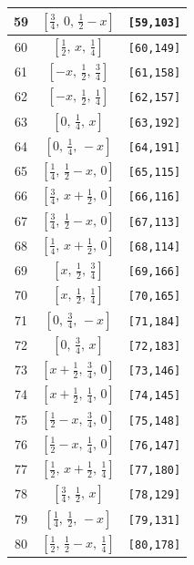 \documentclass[fleqn,8pt]{jsarticle}
\begin{document}
\begin{longtable}{ccc}
59 & $\left[ \frac{3}{4},\, 0,\, \frac{1}{2} - x \right]$ & {\tt [59,103]} \\ \hline
60 & $\left[ \frac{1}{2},\, x,\, \frac{1}{4} \right]$ & {\tt [60,149]} \\ \hline
61 & $\left[ - x,\, \frac{1}{2},\, \frac{3}{4} \right]$ & {\tt [61,158]} \\ \hline
62 & $\left[ - x,\, \frac{1}{2},\, \frac{1}{4} \right]$ & {\tt [62,157]} \\ \hline
63 & $\left[ 0,\, \frac{1}{4},\, x \right]$ & {\tt [63,192]} \\ \hline
64 & $\left[ 0,\, \frac{1}{4},\, - x \right]$ & {\tt [64,191]} \\ \hline
65 & $\left[ \frac{1}{4},\, \frac{1}{2} - x,\, 0 \right]$ & {\tt [65,115]} \\ \hline
66 & $\left[ \frac{3}{4},\, x + \frac{1}{2},\, 0 \right]$ & {\tt [66,116]} \\ \hline
67 & $\left[ \frac{3}{4},\, \frac{1}{2} - x,\, 0 \right]$ & {\tt [67,113]} \\ \hline
68 & $\left[ \frac{1}{4},\, x + \frac{1}{2},\, 0 \right]$ & {\tt [68,114]} \\ \hline
69 & $\left[ x,\, \frac{1}{2},\, \frac{3}{4} \right]$ & {\tt [69,166]} \\ \hline
70 & $\left[ x,\, \frac{1}{2},\, \frac{1}{4} \right]$ & {\tt [70,165]} \\ \hline
71 & $\left[ 0,\, \frac{3}{4},\, - x \right]$ & {\tt [71,184]} \\ \hline
72 & $\left[ 0,\, \frac{3}{4},\, x \right]$ & {\tt [72,183]} \\ \hline
73 & $\left[ x + \frac{1}{2},\, \frac{3}{4},\, 0 \right]$ & {\tt [73,146]} \\ \hline
74 & $\left[ x + \frac{1}{2},\, \frac{1}{4},\, 0 \right]$ & {\tt [74,145]} \\ \hline
75 & $\left[ \frac{1}{2} - x,\, \frac{3}{4},\, 0 \right]$ & {\tt [75,148]} \\ \hline
76 & $\left[ \frac{1}{2} - x,\, \frac{1}{4},\, 0 \right]$ & {\tt [76,147]} \\ \hline
77 & $\left[ \frac{1}{2},\, x + \frac{1}{2},\, \frac{1}{4} \right]$ & {\tt [77,180]} \\ \hline
78 & $\left[ \frac{3}{4},\, \frac{1}{2},\, x \right]$ & {\tt [78,129]} \\ \hline
79 & $\left[ \frac{1}{4},\, \frac{1}{2},\, - x \right]$ & {\tt [79,131]} \\ \hline
80 & $\left[ \frac{1}{2},\, \frac{1}{2} - x,\, \frac{1}{4} \right]$ & {\tt [80,178]} \\ \hline

\end{longtable}
\end{document}
